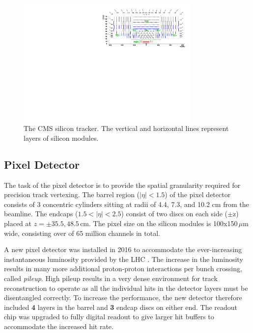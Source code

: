 \begin{figure}[hbp!]
\centering
\includegraphics[width=0.8\textwidth]{figs/TrackerLayoutNew.pdf}
\caption[The CMS silicon tracker]{The CMS silicon tracker. The vertical and horizontal lines represent layers of silicon modules.}
\label{fig:tracker}
\end{figure}

\subsection{Pixel Detector}

The task of the pixel detector is to provide the spatial granularity required for precision track vertexing. The barrel region ($|\eta|<1.5$) of the pixel detector consists of 3 concentric cylinders sitting at radii of 4.4, 7.3, and 10.2 cm from the beamline. The endcaps ($1.5<|\eta|<2.5$) consist of two discs on each side ($\pm$z) placed at $z = \pm 35.5, 48.5\,\textrm{cm}$. The pixel size on the silicon modules is 100x150$\,$$\mu$m wide, consisting over of 65 million channels in total.

A new pixel detector was installed in 2016 to accommodate the ever-increasing instantaneous luminosity provided by the LHC \cite{newpixel}. The increase in the luminosity results in many more additional proton-proton interactions per bunch crossing, called \textit{pileup}.  High pileup results in a very dense environment for track reconstruction to operate as all the individual hits in the detector layers must be disentangled correctly. To increase the performance, the new detector therefore included \textbf{4} layers in the barrel and \textbf{3} endcap discs on either end. The readout chip was upgraded to fully digital readout to give larger hit buffers to accommodate the increased hit rate.

